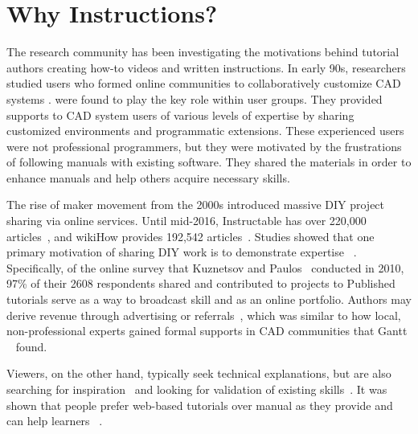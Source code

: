 

\section{Why Instructions?}
\label{background_why}

The research community has been investigating the motivations behind tutorial authors creating how-to videos and written instructions.
%
In early 90s, researchers studied users who formed online communities to collaboratively customize CAD systems \cite{Gantt:1992:GGP:142750.142767}.  were found to play the key role within user groups. They provided supports to CAD system users of various levels of expertise by sharing customized environments and programmatic extensions. These experienced users were not professional programmers, but they were motivated by the frustrations of following manuals with existing software. They shared the materials in order to enhance manuals and help others acquire necessary skills.

The rise of maker movement from the 2000s introduced massive DIY project sharing via online services. Until mid-2016, Instructable has over 220,000 articles~\cite{InstructablesProjects}, and wikiHow provides 192,542 articles~\cite{wikiHowStatistics}.
%
Studies showed that one primary motivation of sharing DIY work is to demonstrate expertise ~\cite{Torrey:2007he,Kuznetsov:2010:REA:1868914.1868950}. Specifically, of the online survey that Kuznetsov and Paulos~\cite{Kuznetsov:2010:REA:1868914.1868950} conducted in 2010, 97\% of their 2608 respondents shared and contributed to projects to  Published tutorials serve as a way to broadcast skill and as an online portfolio.
%
Authors may derive revenue through advertising or referrals~\cite{Lafreniere:2012tl}, which was similar to how local, non-professional experts gained formal supports in CAD communities that Gantt \ea{}~\cite{Gantt:1992:GGP:142750.142767} found.

Viewers, on the other hand, typically seek technical explanations, but are also searching for inspiration~\cite{Torrey:2009fc} and looking for validation of existing skills~\cite{Lafreniere:2012tl}.
%
It was shown that people prefer web-based tutorials over manual as they provide  and can help learners ~\cite{BenLafreniere:2013ux}.

